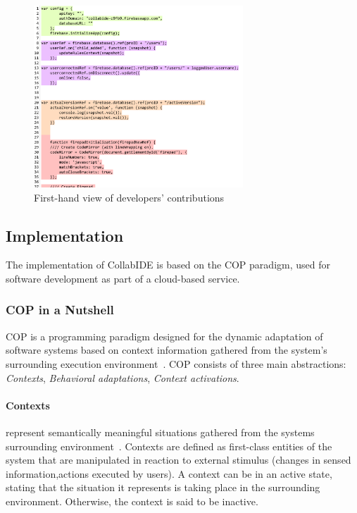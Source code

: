 \begin{figure}[htbp]
  \centering
  \includegraphics[width=0.7\textwidth]{img/fig2-collabIDEConcurrentProgramming}
  \caption{First-hand view of developers' contributions}
  \label{fig:layers}
\end{figure}


\subsection{Implementation}
\label{sec:implementation}

The implementation of CollabIDE is based on the \acf{COP} paradigm, used for software development 
as part of a cloud-based service.

\subsubsection{\ac{COP} in a Nutshell}
\ac{COP} is a programming paradigm designed for the dynamic adaptation of software systems based on context information gathered from the system's surrounding execution environment~\cite{salvaneschi+12survey}. \ac{COP} consists of three main abstractions: \emph{Contexts}, \emph{Behavioral adaptations}, \emph{Context activations}.

\paragraph{Contexts} represent semantically meaningful situations gathered from the systems surrounding environment~\cite{dey01}. Contexts are defined as first-class entities of the system that are manipulated in reaction to external stimulus (\eg changes in sensed information,actions executed by users). A context can be in an active state, stating that the situation it represents is taking place in the surrounding environment. Otherwise, the context is said to be inactive.

